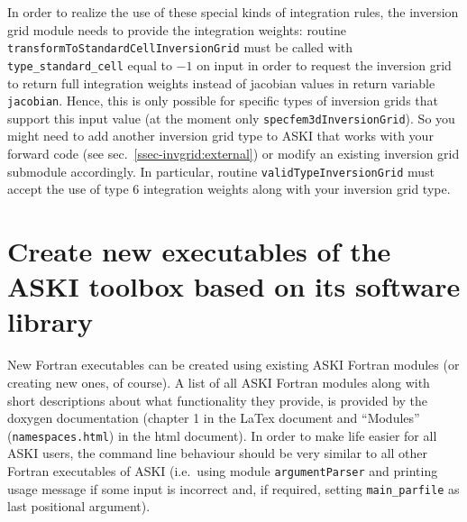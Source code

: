 \documentclass[12pt,a4paper]{article}
\newcommand{\lcode}[1]{\nolinkurl{#1}}
\newcommand{\ASKI}{ {\ttfamily ASKI} }
\begin{document}
In order to realize the use of these special kinds of integration rules, the inversion grid module needs to provide the
integration weights: routine \lcode{transformToStandardCellInversionGrid} must be called with 
\lcode{type_standard_cell} equal to $-1$ on input in order to request the inversion grid to return full 
integration weights instead of jacobian values in return variable \lcode{jacobian}.
Hence, this is only possible for specific types of inversion grids that support this input value (at the moment 
only \lcode{specfem3dInversionGrid}). So you might need to add another inversion grid type to \ASKI{} that works 
with your forward code (see sec.~\ref{ssec-invgrid:external}{}) or modify an existing inversion grid submodule 
accordingly. In particular, routine \lcode{validTypeInversionGrid} must accept the use of type 6 integration 
weights along with your inversion grid type.

\section{Create new executables of the \ASKI{} toolbox based on its software library} \label{sec:executables}
%
New Fortran executables can be created using existing \ASKI{} Fortran modules (or creating new ones, of course). 
A list of all \ASKI{} Fortran modules along with short descriptions about what functionality they provide, is
provided by the doxygen documentation (chapter 1 in the LaTex document and ``Modules'' (\lcode{namespaces.html})
in the html document).
In order to make life easier for all \ASKI{} users, the command line behaviour should be very similar to all
other Fortran executables of \ASKI{} (i.e.\ using module \lcode{argumentParser} and printing usage message
if some input is incorrect and, if required, setting \lcode{main_parfile} as last positional argument).
\end{document}

